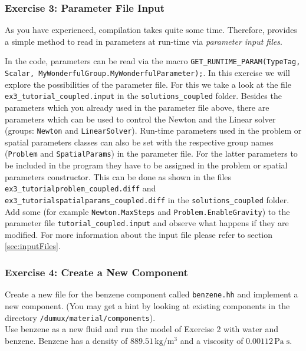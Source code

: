 \subsubsection{Exercise 3: Parameter File Input}

As you have experienced, compilation takes quite some time. Therefore,
\Dumux provides a simple method to read in parameters at run-time
via \textit{parameter input files}.

In the code, parameters can be read via the macro
\texttt{GET\_RUNTIME\_PARAM(TypeTag, Scalar,
MyWonderfulGroup.MyWonderfulParameter);}. In this exercise we will explore the possibilities of the 
parameter file. For this we take a look at the file \texttt{ex3\_tutorial\_coupled.input} in the \texttt{solutions\_coupled} folder.
Besides the parameters which you already used in the parameter file above, there are parameters which can be used to control the
Newton and the Linear solver (groups: \texttt{Newton} and \texttt{LinearSolver}). Run-time parameters used in the problem or spatial parameters classes
can also be set with the respective group names (\texttt{Problem} and \texttt{SpatialParams}) in the parameter file. For the latter parameters to be included in the program
they have to be assigned in the problem or spatial parameters constructor. This can be done as shown in the files \texttt{ex3\_tutorialproblem\_coupled.diff}
and \texttt{ex3\_tutorialspatialparams\_coupled.diff} in the \texttt{solutions\_coupled} folder. Add some (for
example \texttt{Newton.MaxSteps} and \texttt{Problem.EnableGravity}) to the
parameter file \texttt{tutorial\_coupled.input} and observe what
happens if they are modified. For more information about the input file please refer to section \ref{sec:inputFiles}.

\subsubsection{Exercise 4: Create a New Component}

Create a new file for the benzene component called \texttt{benzene.hh}
and implement a new component. (You may get a hint by looking at
existing components in the directory \verb+/dumux/material/components+). \\
Use benzene as a new fluid and run the model of Exercise 2 with water
and benzene. Benzene has a density of $889.51 \, \text{kg} /
\text{m}^3$ and a viscosity of $0.00112 \, \text{Pa} \; \text{s}$.

\clearpage \newpage
